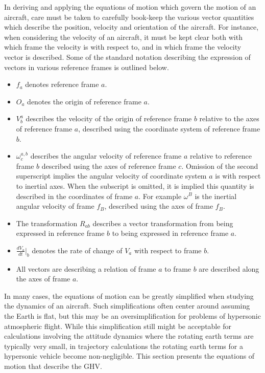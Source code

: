 In deriving and applying the equations of motion which govern the motion of an aircraft, care must be taken to carefully book-keep the various vector quantities which describe the position, velocity and orientation of the aircraft.
For instance, when considering the velocity of an aircraft, it must be kept clear both with which frame the velocity is with respect to, and in which frame the velocity vector is described.
Some of the standard notation describing the expression of vectors in various reference frames is outlined below.
\begin{itemize}
  \item{$f_{a}$ denotes reference frame $a$.}
  \item{$O_{a}$ denotes the origin of reference frame $a$.}
  \item{$V^{a}_{b}$ describes the velocity of the origin of reference frame $b$ relative to the axes of reference frame $a$, described using the coordinate system of reference frame $b$.}
  \item{$\omega^{a,b}_{c}$ describes the angular velocity of reference frame $a$ relative to reference frame $b$ described using the axes of reference frame $c$. Omission of the second superscript implies the angular velocity of coordinate system $a$ is with respect to inertial axes. When the subscript is omitted, it is implied this quantity is described in the coordinates of frame $a$. For example $\omega^{B}$ is the inertial angular velocity of frame $f_{B}$, described using the axes of frame $f_{B}$.}
  \item{The transformation $R_{ab}$ describes a vector transformation from being expressed in reference frame $b$ to being expressed in reference frame $a$.}
  \item{$\frac{dV_{a}}{dt}\bigr|_{b}$ denotes the rate of change of $V_{a}$ with respect to frame $b$.}
  \item{All vectors are describing a relation of frame $a$ to frame $b$ are described along the axes of frame $a$.}
\end{itemize}

In many cases, the equations of motion can be greatly simplified when studying the dynamics of an aircraft.
Such simplifications often center around assuming the Earth is flat, but this may be an oversimplification for problems of hypersonic atmospheric flight.
While this simplification still might be acceptable for calculations involving the attitude dynamics where the rotating earth terms are typically very small, in trajectory calculations the rotating earth terms for a hypersonic vehicle become non-negligible.
This section presents the equations of motion that describe the GHV.\@

